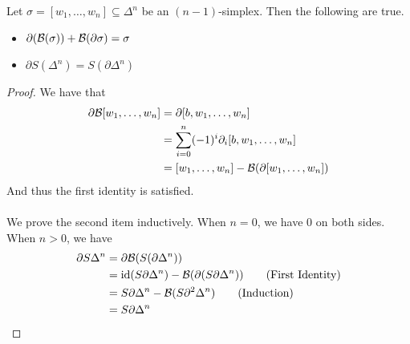 \documentclass[a4paper]{article}
\begin{document}
\begin{lmm}{}{} Let $\sigma=[w_1,\dots,w_n]\subseteq\Delta^n$ be an $(n-1)$-simplex. Then the following are true. 
\begin{itemize}
\item $\partial(\mathcal{B}(\sigma))+\mathcal{B}(\partial\sigma)=\sigma$ 
\item $\partial S(\Delta^n)=S(\partial\Delta^n)$
\end{itemize} \tcbline
\begin{proof}
We have that 
\begin{align*}
\partial\mathcal{B}[w_1,\dots,w_n]&=\partial[b,w_1,\dots,w_n]\\
&=\sum_{i=0}^n(-1)^i\partial_i[b,w_1,\dots,w_n]\\
&=[w_1,\dots,w_n]-\mathcal{B}(\partial[w_1,\dots,w_n])
\end{align*}
And thus the first identity is satisfied. \\~\\
We prove the second item inductively. When $n=0$, we have $0$ on both sides. When $n>0$, we have
\begin{align*}
\partial S\Delta^n&=\partial\mathcal{B}(S(\partial\Delta^n))\\
&=\text{id}(S\partial\Delta^n)-\mathcal{B}(\partial(S\partial\Delta^n))\tag{First Identity}\\
&=S\partial\Delta^n-\mathcal{B}(S\partial^2\Delta^n)\tag{Induction}\\
&=S\partial\Delta^n
\end{align*}
\end{proof}
\end{lmm}
\end{document}
